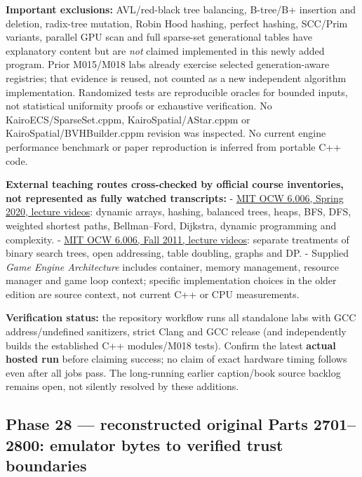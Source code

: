 \textbf{Important exclusions:} AVL/red-black tree balancing, B-tree/B+ insertion and deletion, radix-tree mutation, Robin Hood hashing, perfect hashing, SCC/Prim variants, parallel GPU scan and full sparse-set generational tables have explanatory content but are \emph{not} claimed implemented in this newly added program. Prior M015/M018 labs already exercise selected generation-aware registries; that evidence is reused, not counted as a new independent algorithm implementation. Randomized tests are reproducible oracles for bounded inputs, not statistical uniformity proofs or exhaustive verification. No KairoECS/SparseSet.cppm, KairoSpatial/AStar.cppm or KairoSpatial/BVHBuilder.cppm revision was inspected. No current engine performance benchmark or paper reproduction is inferred from portable C++ code.

\textbf{External teaching routes cross-checked by official course inventories, not represented as fully watched transcripts:} - \href{https://ocw.mit.edu/courses/6-006-introduction-to-algorithms-spring-2020/video_galleries/lecture-videos/}{MIT OCW 6.006, Spring 2020, lecture videos}: dynamic arrays, hashing, balanced trees, heaps, BFS, DFS, weighted shortest paths, Bellman--Ford, Dijkstra, dynamic programming and complexity. - \href{https://ocw.mit.edu/courses/6-006-introduction-to-algorithms-fall-2011/video_galleries/lecture-videos/}{MIT OCW 6.006, Fall 2011, lecture videos}: separate treatments of binary search trees, open addressing, table doubling, graphs and DP. - Supplied \emph{Game Engine Architecture} includes container, memory management, resource manager and game loop context; specific implementation choices in the older edition are source context, not current C++ or CPU measurements.

\textbf{Verification status:} the repository workflow runs all standalone labs with GCC address/undefined sanitizers, strict Clang and GCC release (and independently builds the established C++ modules/M018 tests). Confirm the latest \textbf{actual hosted run} before claiming success; no claim of exact hardware timing follows even after all jobs pass. The long-running earlier caption/book source backlog remains open, not silently resolved by these additions.

\subsection{Phase 28 --- reconstructed original Parts 2701--2800: emulator bytes to verified trust boundaries}\label{appendix-a103e7846d21-phase-28-reconstructed-original-parts-27012800-emulator-bytes-to-verified-trust-boundaries}

